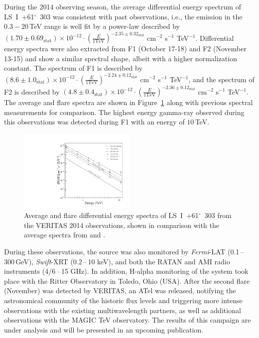 \documentclass[preprint2]{aastex}
\newcommand{\tapp}{\raisebox{0.5ex}{\texttildelow}}
\newcommand{\lsi}{LS~I~+61$^{\circ}$~303}
\newcommand{\gev}{\,GeV}
\newcommand{\tev}{\,TeV}
\begin{document}
During the 2014 observing season, the average differential energy spectrum of \lsi{} was consistent with past observations, i.e., the emission in the $0.3-20$\tev{} range is well fit by a power-law described by $\left( 1.70 \pm 0.69_{\mathrm{stat}} \right) \times 10^{-12} \cdot \left( \frac{E}{\mathrm{1 TeV}} \right)^{-2.35 \pm 0.32_{\mathrm{stat}}}$ cm$^{-2}$ s$^{-1}$ TeV$^{-1}$. Differential energy spectra were also extracted from F1 (October 17-18)  and F2 (November 13-15) and show a similar spectral shape, albeit with a higher normalization constant. The spectrum of F1 is described by $\left( 8.6 \pm 1.0_{\mathrm{stat}} \right) \times 10^{-12} \cdot \left( \frac{E}{\mathrm{1 TeV}} \right)^{-2.24 \pm 0.12_{\mathrm{stat}}}$ cm$^{-2}$ s$^{-1}$ TeV$^{-1}$, and the spectrum of F2 is described by $\left( 4.8 \pm 0.4_{\mathrm{stat}} \right) \times 10^{-12} \cdot \left( \frac{E}{\mathrm{1 TeV}} \right)^{-2.36 \pm 0.12_{\mathrm{stat}}}$ cm$^{-2}$ s$^{-1}$ TeV$^{-1}$. The average and flare spectra are shown in Figure~\ref{spec} along with previous spectral measurements for comparison. The highest energy gamma-ray observed during this observations was detected during F1 with an energy of \tapp{}$10$\tev{}.

\begin{figure}[ht]
\centering
\includegraphics[width=0.5\textwidth]{figs/all_spectra_vegas.pdf}
\caption{Average and flare differential energy spectra of \lsi{} from the VERITAS 2014 observations, shown in comparison with the average spectra from \citet{VERITASLSIDetection} and \citet{Aleksic}.}
\label{spec}
\end{figure}

During these observations, the source was also monitored by \emph{Fermi}-LAT (0.1\,--\,300\gev{}), \emph{Swift}-XRT (0.2\,--\,10 keV), and both the RATAN and AMI radio instruments (4/6\,--\,15 GHz). In addition, H-alpha monitoring of the system took place with the Ritter Observatory in Toledo, Ohio (USA). After the second flare (November) was detected by VERITAS, an ATel \citep{2015VTSATEL} was released, notifying the astronomical community of the historic flux levels and triggering more intense observations with the existing multiwavelength partners, as well as additional observations with the MAGIC TeV observatory. The results of this campaign are under analysis and will be presented in an upcoming publication. 
\end{document}
